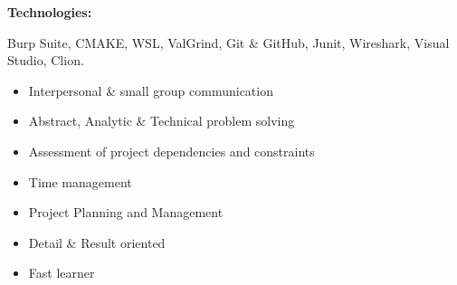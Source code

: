\documentclass[9pt]{developercv}
\begin{document}
\begin{minipage}[t]{0.49\textwidth}
\begin{minipage}[t]{.98\textwidth}
    \vspace{2.5mm}
    \begin{minipage}[t]{0.2\textwidth}
        \textbf{Technologies:}
    \end{minipage}
    \hfill
    \begin{minipage}[t]{0.73\textwidth}
      Burp Suite, CMAKE, WSL, ValGrind, Git \& GitHub, Junit, Wireshark, Visual Studio, Clion.\\
    \end{minipage}
    \end{minipage}
    \vspace{-20pt}
    \begin{itemize}[itemsep=2pt,topsep=0pt,parsep=0pt,partopsep=0pt, leftmargin=2em]
        \item Interpersonal \& small group communication
        \item Abstract, Analytic \& Technical problem solving
        \item Assessment of project dependencies and constraints
        \item Time management
        \item Project Planning and Management
        \item Detail \& Result oriented
        \item Fast learner
    \end{itemize}
\end{minipage}
\end{document}
